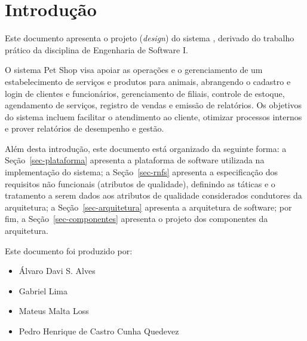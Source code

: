 \chapter{Introdução}
\label{sec-intro}
\vspace{-1cm}

Este documento apresenta o projeto (\textit{design}) do sistema \emph{\imprimirtitulo}, derivado do trabalho prático da disciplina de Engenharia de Software I.

O sistema Pet Shop visa apoiar as operações e o gerenciamento de um estabelecimento de serviços e produtos para animais, abrangendo o cadastro e login de clientes e funcionários, gerenciamento de filiais, controle de estoque, agendamento de serviços, registro de vendas e emissão de relatórios.
Os objetivos do sistema incluem facilitar o atendimento ao cliente, otimizar processos internos e prover relatórios de desempenho e gestão.

Além desta introdução, este documento está organizado da seguinte forma:
a Seção~\ref{sec-plataforma} apresenta a plataforma de software utilizada na implementação do sistema;
a Seção~\ref{sec-rnfs} apresenta a especificação dos requisitos não funcionais (atributos de qualidade), definindo as táticas e o tratamento a serem dados aos atributos de qualidade considerados condutores da arquitetura;
a Seção~\ref{sec-arquitetura} apresenta a arquitetura de software; por fim,
a Seção~\ref{sec-componentes} apresenta o projeto dos componentes da arquitetura.

Este documento foi produzido por:
\begin{itemize}
	\item Álvaro Davi S. Alves \
	\item Gabriel Lima \
	\item Mateus Malta Loss \
	\item Pedro Henrique de Castro Cunha Quedevez \

\end{itemize}

